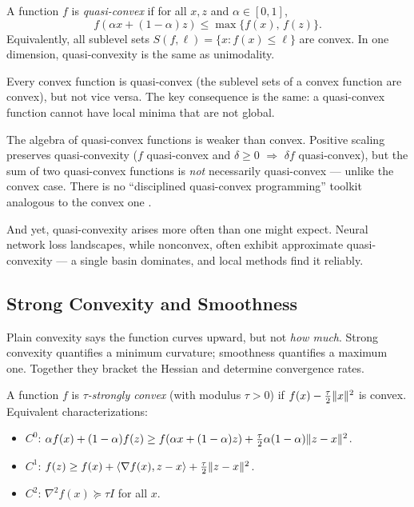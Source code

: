\begin{defn}\label{def:quasiconvex}
	A function $f$ is \textit{quasi-convex} if for all $x, z$ and $\alpha \in [0,1]$,
	\begin{equation}\label{eq:quasiconvexity}
		f(\alpha x + (1 - \alpha) z) \leq \max\{f(x),\, f(z)\}.
	\end{equation}
	Equivalently, all sublevel sets $S(f, \ell) = \{x : f(x) \leq \ell\}$ are convex.
	In one dimension, quasi-convexity is the same as unimodality.
\end{defn}

Every convex function is quasi-convex (the sublevel sets of a convex function are convex), but not vice versa.
The key consequence is the same: a quasi-convex function cannot have local minima that are not global.

The algebra of quasi-convex functions is weaker than convex.
Positive scaling preserves quasi-convexity ($f$ quasi-convex and $\delta \geq 0$ $\Rightarrow$ $\delta f$ quasi-convex), but the sum of two quasi-convex functions is \emph{not} necessarily quasi-convex --- unlike the convex case.
There is no ``disciplined quasi-convex programming'' toolkit analogous to the convex one \cite{boyd2008}.

And yet, quasi-convexity arises more often than one might expect.
Neural network loss landscapes, while nonconvex, often exhibit approximate quasi-convexity --- a single basin dominates, and local methods find it reliably.


\subsection{Strong Convexity and Smoothness}\label{ssec:strong-convex}

Plain convexity says the function curves upward, but not \emph{how much}.
Strong convexity quantifies a minimum curvature; smoothness quantifies a maximum one.
Together they bracket the Hessian and determine convergence rates.

\begin{defn}\label{def:strong-convex}
	A function $f$ is \textit{$\tau$-strongly convex} (with modulus $\tau > 0$) if $f(x) - \frac{\tau}{2}\lVert x\rVert^2$ is convex.
	Equivalent characterizations:
	\begin{itemize}
		\item $C^0$: $\alpha f(x) + (1 - \alpha)f(z) \geq f(\alpha x + (1 - \alpha)z) + \frac{\tau}{2}\alpha(1 - \alpha)\lVert z - x\rVert^2$.
		\item $C^1$: $f(z) \geq f(x) + \langle\nabla f(x), z - x\rangle + \frac{\tau}{2}\lVert z - x\rVert^2$.
		\item $C^2$: $\nabla^2 f(x) \succeq \tau I$ for all $x$.
	\end{itemize}
\end{defn}

